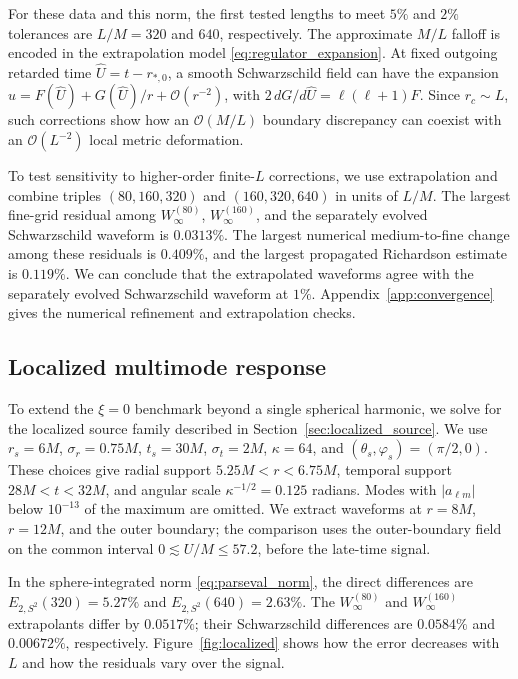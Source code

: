 \documentclass[
 aps,
 prd,
 reprint,
 superscriptaddress,
 nofootinbib,
 longbibliography
]{revtex4-2}
\begin{document}
For these data and this norm, the first tested lengths to meet $5\%$ and
$2\%$ tolerances are $L/M=320$ and $640$, respectively. 
The approximate $M/L$ falloff is encoded in the extrapolation model
\eqref{eq:regulator_expansion}.
At fixed outgoing retarded time $\widehat U=t-r_{*,0}$, a smooth
Schwarzschild field can have the expansion
$u=F(\widehat U)+G(\widehat U)/r+\mathcal O(r^{-2})$, with
$2\,dG/d\widehat U=\ell(\ell+1)F$.  Since $r_c\sim L$, such corrections
show how an $\mathcal O(M/L)$ boundary discrepancy can coexist with
an $\mathcal O(L^{-2})$ local metric deformation.

To test sensitivity to higher-order finite-$L$ corrections, we use extrapolation and combine triples $(80,160,320)$ and
$(160,320,640)$ in units of $L/M$. The largest fine-grid residual among
$W_\infty^{(80)}$, $W_\infty^{(160)}$, and the separately evolved
Schwarzschild waveform is $0.0313\%$.  The largest numerical medium-to-fine change
among these residuals is $0.409\%$, and
the largest propagated Richardson estimate is $0.119\%$. We can conclude that the extrapolated waveforms agree with the separately evolved Schwarzschild waveform at $1\%$. 
Appendix~\ref{app:convergence} gives
the numerical refinement and extrapolation checks.

\subsection{Localized multimode response}
\label{sec:localized_results}

To extend the $\xi=0$ benchmark beyond a single spherical harmonic, we solve for the localized source family described in Section~\ref{sec:localized_source}.  We use $r_s=6M$, $\sigma_r=0.75M$, $t_s=30M$,
$\sigma_t=2M$, $\kappa=64$, and $(\theta_s,\varphi_s)=(\pi/2,0)$.
These choices give radial support $5.25M<r<6.75M$, temporal support
$28M<t<32M$, and angular scale $\kappa^{-1/2}=0.125$ radians.  Modes with
$|a_{\ell m}|$ below $10^{-13}$ of the maximum are omitted.  We extract
waveforms at $r=8M$, $r=12M$, and the outer boundary; the comparison
uses the outer-boundary field on the common interval
$0\lesssim U/M\leq57.2$, before the late-time signal.

In the sphere-integrated norm \eqref{eq:parseval_norm}, the direct differences are
$E_{2,S^2}(320)=5.27\%$ and $E_{2,S^2}(640)=2.63\%$.  The
$W_\infty^{(80)}$ and $W_\infty^{(160)}$ extrapolants differ by $0.0517\%$;
their Schwarzschild differences are $0.0584\%$ and
$0.00672\%$, respectively. Figure~\ref{fig:localized} shows how the error decreases with $L$ and how the residuals vary over the signal.
\end{document}
